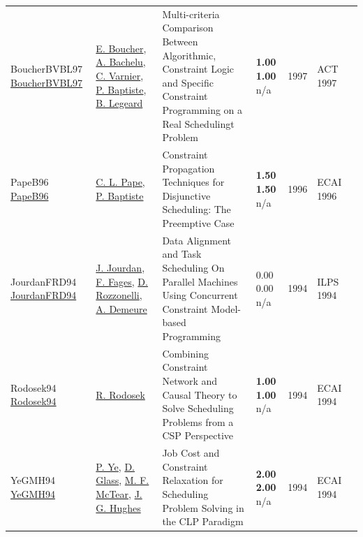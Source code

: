 {\begin{longtable}{p{3cm}p{5cm}p{10cm}p{1cm}rp{2.5cm}l}
BoucherBVBL97 \href{}{BoucherBVBL97} & \hyperref[auth:a689]{E. Boucher}, \hyperref[auth:a690]{A. Bachelu}, \hyperref[auth:a691]{C. Varnier}, \hyperref[auth:a692]{P. Baptiste}, \hyperref[auth:a693]{B. Legeard} & Multi-criteria Comparison Between Algorithmic, Constraint Logic and Specific Constraint Programming on a Real Schedulingt Problem & \noindent{}\textbf{1.00} \textbf{1.00} n/a & 1997 & ACT 1997 & \cite{BoucherBVBL97}\\
PapeB96 \href{}{PapeB96} & \hyperref[auth:a163]{C. L. Pape}, \hyperref[auth:a162]{P. Baptiste} & Constraint Propagation Techniques for Disjunctive Scheduling: The Preemptive Case & \noindent{}\textbf{1.50} \textbf{1.50} n/a & 1996 & ECAI 1996 & \cite{PapeB96}\\
JourdanFRD94 \href{}{JourdanFRD94} & \hyperref[auth:a696]{J. Jourdan}, \hyperref[auth:a697]{F. Fages}, \hyperref[auth:a698]{D. Rozzonelli}, \hyperref[auth:a699]{A. Demeure} & Data Alignment and Task Scheduling On Parallel Machines Using Concurrent Constraint Model-based Programming & \noindent{}\textcolor{black!50}{0.00} \textcolor{black!50}{0.00} n/a & 1994 & ILPS 1994 & \cite{JourdanFRD94}\\
Rodosek94 \href{}{Rodosek94} & \hyperref[auth:a297]{R. Rodosek} & Combining Constraint Network and Causal Theory to Solve Scheduling Problems from a {CSP} Perspective & \noindent{}\textbf{1.00} \textbf{1.00} n/a & 1994 & ECAI 1994 & \cite{Rodosek94}\\
YeGMH94 \href{}{YeGMH94} & \hyperref[auth:a1256]{P. Ye}, \hyperref[auth:a1257]{D. Glass}, \hyperref[auth:a1258]{M. F. McTear}, \hyperref[auth:a1259]{J. G. Hughes} & Job Cost and Constraint Relaxation for Scheduling Problem Solving in the {CLP} Paradigm & \noindent{}\textbf{2.00} \textbf{2.00} n/a & 1994 & ECAI 1994 & \cite{YeGMH94}\\
\end{longtable}
}

